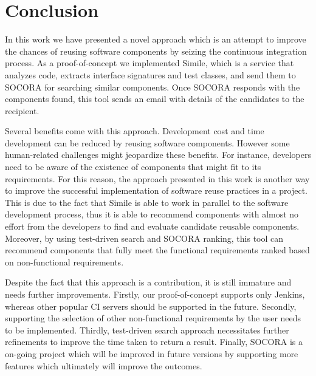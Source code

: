 \chapter{Conclusion}
\label{conclusion}
In this work we have presented a novel approach which is an attempt to improve the chances of reusing software components by seizing the continuous integration process. As a proof-of-concept we implemented Simile, which is a service that analyzes code, extracts interface signatures and test classes, and send them to SOCORA for searching similar components. Once SOCORA responds with the components found, this tool sends an email with details of the candidates to the recipient.

Several benefits come with this approach. Development cost and time development can be reduced by reusing software components. However some human-related challenges might jeopardize these benefits. For instance, developers need to be aware of the existence of components that might fit to its requirements. For this reason, the approach presented in this work is another way to improve the successful implementation of software reuse practices in a project. This is due to the fact that Simile is able to work in parallel to the software development process, thus it is able to recommend components with almost no effort from the developers to find and evaluate candidate reusable components. Moreover, by using test-driven search and SOCORA ranking, this tool can recommend components that fully meet the functional requirements ranked based on non-functional requirements.

Despite the fact that this approach is a contribution, it is still immature and needs further improvements. Firstly, our proof-of-concept supports only Jenkins, whereas other popular CI servers should be supported in the future. Secondly, supporting the selection of other non-functional requirements by the user needs to be implemented. Thirdly, test-driven search approach necessitates further refinements to improve the time taken to return a result. Finally, SOCORA is a on-going project which will be improved in future versions by supporting more features which ultimately will improve the outcomes.


